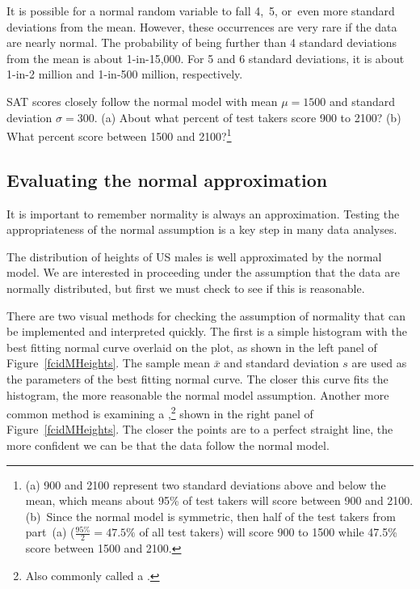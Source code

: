 It is possible for a normal random variable to fall 4,~5, or~even more standard deviations from the mean. However, these occurrences are very rare if the data are nearly normal. The probability of being further than 4 standard deviations from the mean is about 1-in-15,000. For 5 and 6 standard deviations, it is about 1-in-2 million and 1-in-500 million, respectively.

\begin{exercise}
SAT scores closely follow the normal model with mean $\mu = 1500$ and standard deviation $\sigma = 300$. (a) About what percent of test takers score 900 to 2100? (b) What percent score between 1500 and 2100?\footnote{(a) 900 and 2100 represent two standard deviations above and below the mean, which means about 95\% of test takers will score between 900 and 2100. (b)~Since the normal model is symmetric, then half of the test takers from part~(a) ($\frac{95\%}{2} = 47.5\%$ of all test takers) will score 900 to 1500 while 47.5\% score between 1500 and 2100.}
\end{exercise}


\subsection{Evaluating the normal approximation}
\label{assessingNormal}

It is important to remember normality is always an approximation. Testing the appropriateness of the normal assumption is a key step in many data analyses.


The distribution of heights of US males is well approximated by the normal model. We are interested in proceeding under the assumption that the data are normally distributed, but first we must check to see if this is reasonable.

There are two visual methods for checking the assumption of normality that can be implemented and interpreted quickly. The first is a simple histogram with the best fitting normal curve overlaid on the plot, as shown in the left panel of Figure~\ref{fcidMHeights}. The sample mean $\bar{x}$ and standard deviation $s$ are used as the parameters of the best fitting normal curve. The closer this curve fits the histogram, the more reasonable the normal model assumption. Another more common method is examining a ,\footnote{Also commonly called a .} shown in the right panel of Figure~\ref{fcidMHeights}. The closer the points are to a perfect straight line, the more confident we can be that the data follow the normal model.

